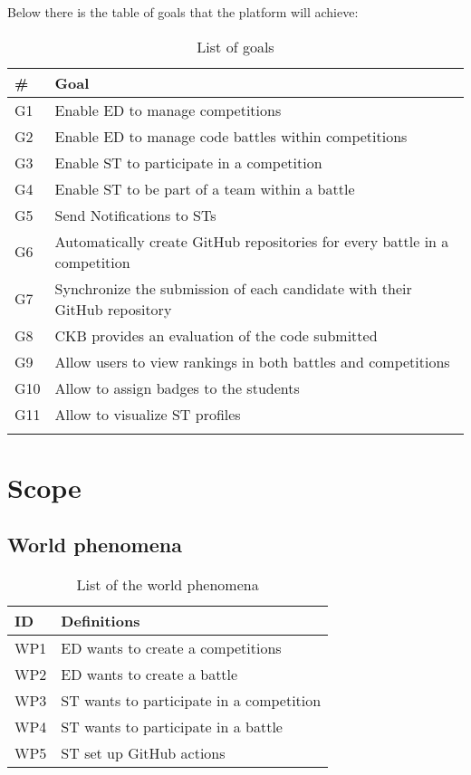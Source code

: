 Below there is the table of goals that the platform will achieve:
\begin{longtable}{|l|l|}
  \hline
  \textbf{\#} & \textbf{Goal}      \\
  \hline
  G1 & Enable ED to manage competitions \\
  \hline
  G2 & Enable ED to manage code battles within competitions \\
  \hline
  G3 & Enable ST to participate in a competition \\
  \hline
  G4 & Enable ST to be part of a team within a battle \\
  \hline
  G5 & Send Notifications to STs   \\
  \hline
  G6 & Automatically create GitHub repositories for every battle in a competition    \\
  \hline
  G7 & Synchronize the submission of each candidate with their GitHub repository   \\
  \hline
  G8 & CKB provides an evaluation of the code submitted    \\
  \hline
  G9 & Allow users to view rankings in both battles and competitions   \\
  \hline
  G10 & Allow to assign badges to the students    \\
  \hline
  G11 & Allow to visualize ST profiles \\
  \hline
  \caption{List of goals}
  \label{tab:goals}
\end{longtable}

\pagebreak
\section{Scope}
\label{s:Scope}%

\subsection{World phenomena}
\label{ss:world_phenomena}%

\begin{table}[H]
  \begin{tabular}{|l|l|}

    \hline
    \textbf{ID} & \textbf{Definitions}      \\
    \hline
    WP1 & ED wants to create a competitions \\
    \hline
    WP2 & ED wants to create a battle \\
    \hline
    WP3 & ST wants to participate in a competition \\
    \hline
    WP4 & ST wants to participate in a battle     \\
    \hline
    WP5 & ST set up GitHub actions    \\
    \hline
    
  \end{tabular}
  \caption{List of the world phenomena}
  \label{tab:worldPhenomena}
\end{table}

